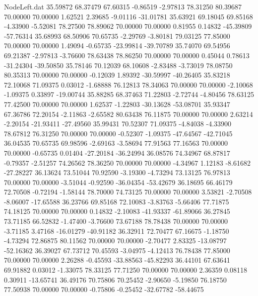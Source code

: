 \begin{filecontents}{NodeLeft.dat}
  35.59872   68.37479   67.60315    -0.86519   -2.97813   78.31250   80.39687   70.00000   70.00000    1.62521    2.39685   -9.01116  -31.01781
  35.63921   69.18045   69.85168    -4.33900   -5.52081   78.27500   78.89062   70.00000   70.00000    0.81955    0.14832  -45.39809  -57.76314
  35.68993   68.50906   70.65735    -2.29769   -3.80181   79.03125   77.85000   70.00000   70.00000    1.49094   -0.65735  -23.99814  -39.70789
  35.74070   69.54956   69.21387    -2.97813   -3.76600   78.63438   78.86250   70.00000   70.00000    0.45044    0.78613  -31.24304  -39.50850
  35.78146   70.12039   68.10608    -2.83488   -3.73019   78.08750   80.35313   70.00000   70.00000   -0.12039    1.89392  -30.59997  -40.26405
  35.83218   72.10068   71.09375     0.03012   -1.68888   76.12813   78.34063   70.00000   70.00000   -2.10068   -1.09375    0.33897  -19.00744
  35.88285   68.37463   71.22803    -2.72744   -4.80456   78.63125   77.42500   70.00000   70.00000    1.62537   -1.22803  -30.13628  -53.08701
  35.93347   67.36786   72.20154    -2.11863   -2.65582   80.63438   76.11875   70.00000   70.00000    2.63214   -2.20154  -21.93411  -27.49560
  35.99431   70.52307   71.09375    -4.84038   -4.33900   78.67812   76.31250   70.00000   70.00000   -0.52307   -1.09375  -47.64567  -42.71045
  36.04535   70.65735   69.98596    -2.69163   -3.58694   77.91563   77.16563   70.00000   70.00000   -0.65735    0.01404  -27.20184  -36.24994
  36.08576   74.34967   68.87817    -0.79357   -2.51257   74.26562   78.36250   70.00000   70.00000   -4.34967    1.12183   -8.61682  -27.28227
  36.13624   73.51044   70.92590    -3.19300   -4.73294   73.13125   76.97813   70.00000   70.00000   -3.51044   -0.92590  -36.04354  -53.42679
  36.18695   66.46179   72.70508    -0.72194   -1.58144   78.70000   74.73125   70.00000   70.00000    3.53821   -2.70508   -8.06007  -17.65588
  36.23766   69.85168   72.10083    -3.83763   -5.66406   77.71875   74.18125   70.00000   70.00000    0.14832   -2.10083  -41.93337  -61.89066
  36.27845   73.71185   66.52832    -1.47400   -3.76600   73.67188   78.78438   70.00000   70.00000   -3.71185    3.47168  -16.01279  -40.91182
  36.32911   72.70477   67.16675    -1.18750   -4.73294   72.86875   80.11562   70.00000   70.00000   -2.70477    2.83325  -13.08797  -52.16362
  36.39027   67.73712   70.45593    -3.04975   -4.12413   76.78438   77.85000   70.00000   70.00000    2.26288   -0.45593  -33.88563  -45.82293
  36.44101   67.63641   69.91882     0.03012   -1.33075   78.33125   77.71250   70.00000   70.00000    2.36359    0.08118    0.30911  -13.65741
  36.49176   70.75806   70.25452    -2.90650   -5.19850   76.18750   77.50938   70.00000   70.00000   -0.75806   -0.25452  -32.67782  -58.44675

\end{filecontents}
